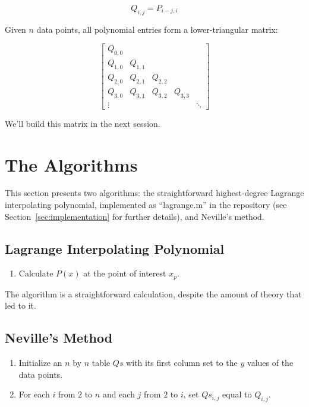 \documentclass[12pt]{article}
\theoremstyle{plain}
\theoremstyle{remark}
\begin{document}
\[
  Q_{i, j} = P_{i-j,i}
\]

Given $n$ data points, all polynomial entries form a lower-triangular matrix:

\[
  \begin{bmatrix}
    Q_{0, 0} \\
    Q_{1, 0} & Q_{1, 1} \\
    Q_{2, 0} & Q_{2, 1} & Q_{2, 2} \\
    Q_{3, 0} & Q_{3, 1} & Q_{3, 2} & Q_{3, 3} \\
    \vdots & & & & \ddots
  \end{bmatrix}
\]

We'll build this matrix in the next session.

\section{The Algorithms}\label{sec:algorithm}

This section presents two algorithms: the straightforward highest-degree Lagrange interpolating polynomial, implemented as ``lagrange.m'' in the repository (see Section~\ref{sec:implementation} for further details), and Neville's method.

\subsection{Lagrange Interpolating Polynomial}

\begin{enumerate}\label{alg:lagrange_alg}
        \item Calculate $P(x)$ at the point of interest $x_p$.
\end{enumerate}

The algorithm is a straightforward calculation, despite the amount of theory that led to it.

\subsection{Neville's Method}

\begin{enumerate}\label{alg:neville_alg}
        \item Initialize an $n$ by $n$ table $Qs$ with its first column set to the $y$ values of the data points.
        \item For each $i$ from $2$ to $n$ and each $j$ from $2$ to $i$, set $Qs_{i,j}$ equal to $Q_{i,j}$.
\end{enumerate}
\end{document}
